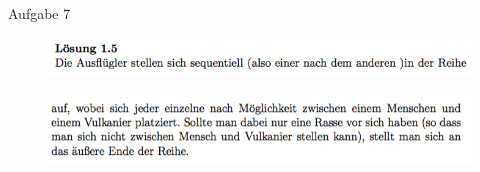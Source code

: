 \begin{frame}{Aufgabe 7}
\begin{figure}[h!]
		\centering
		\includegraphics[width=\textwidth]{../topics/weihnachtstut-aufgaben/19.png} 
	\end{figure}  
	\begin{figure}[h!]
		\centering
		\includegraphics[width=\textwidth]{../topics/weihnachtstut-aufgaben/20.png} 
	\end{figure}   
\end{frame}